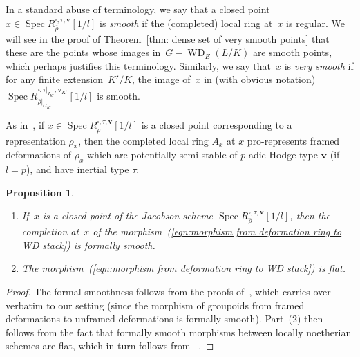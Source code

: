 \documentclass{amsart}
\newtheorem{prop}[subsubsection]{Proposition}
\theoremstyle{definition}
\theoremstyle{remark}
\newcommand{\mar}[1]{}
\newcommand{\mar}[1]{\marginpar{\raggedright\tiny squirrel #1}}
\DeclareMathOperator{\Spec}{Spec}
\DeclareMathOperator{\WD}{WD}
\newcommand{\rhobar}{\overline{\rho}}
\begin{document}
In a standard abuse of terminology, we say that a closed point  $x\in\Spec
R_{\rhobar}^{\square,\tau,\mathbf{v}}[1/l]$ is \emph{smooth}  if the
(completed) local ring at~$x$ is regular. We will see in the proof of
Theorem~\ref{thm: dense set of very smooth points} that these are the
points whose images in~$G-\WD_E(L/K)$ are smooth points, which perhaps
justifies this terminology. Similarly, we say that~$x$ is \emph{very
  smooth} if for any finite extension~$K'/K$, the image of~$x$ in
(with obvious notation) $\Spec R_{\rhobar|_{G_{K'}}}^{\square,\tau|_{I_{K'}},\mathbf{v}_{K'}}[1/l]$ is smooth.

As in~\cite[Proposition 2.3.5]{MR2600871}, if $x\in\Spec
R_{\rhobar}^{\square,\tau,\mathbf{v}}[1/l]$ is a closed point
corresponding to a representation $\rho_x$, then the completed local
ring $A_x$ at $x$ pro-represents framed deformations of $\rho_x$ which
are potentially semi-stable of $p$-adic Hodge type $\mathbf{v}$ (if
$l=p$), and have inertial type $\tau$.%

\begin{prop}
  \label{prop: morphism to WD is formally smooth and flat}
  \begin{enumerate}
  \item If~$x$ is a closed point of the Jacobson scheme
    $\Spec R_{\rhobar}^{\square,\tau,\mathbf{v}}[1/l]$, then the
    completion at~$x$ of the 
    morphism~\emph{(\ref{eqn:morphism from deformation ring to WD stack})} is
formally smooth.
  \item The morphism~\emph{(\ref{eqn:morphism from deformation ring to WD stack})} is flat.
  \end{enumerate}
\end{prop}
\begin{proof}The formal smoothness follows from the proofs
  of~\cite[Lemma 3.2.1, Proposition 3.3.1]{MR2373358}, which carries over verbatim
  to our setting (since the morphism of groupoids from framed deformations to unframed deformations is formally
  smooth). %
  Part~(2) then follows from the fact that formally
  smooth morphisms between locally noetherian schemes are flat, which
  in turn follows from ~\cite[\S0 Thm.\
  19.7.1]{MR0173675}. 
\end{proof}
\end{document}

